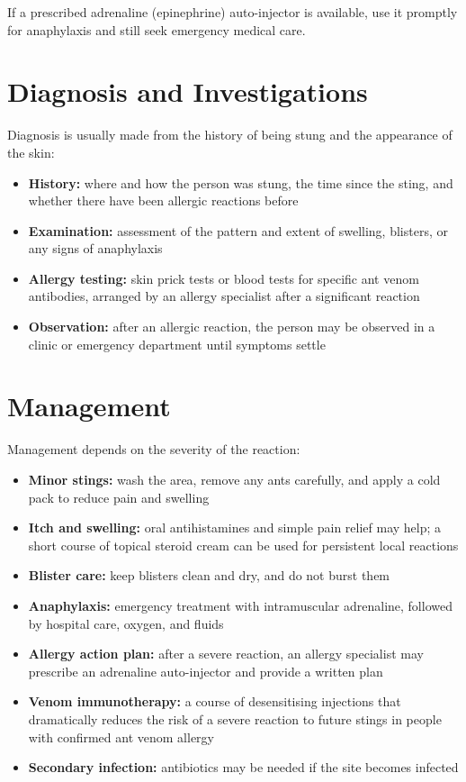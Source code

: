 If a prescribed adrenaline (epinephrine) auto-injector is available, use it promptly for anaphylaxis and still seek emergency medical care.

\section*{Diagnosis and Investigations}
Diagnosis is usually made from the history of being stung and the appearance of the skin:

\begin{itemize}
    \item \textbf{History:} where and how the person was stung, the time since the sting, and whether there have been allergic reactions before
    \item \textbf{Examination:} assessment of the pattern and extent of swelling, blisters, or any signs of anaphylaxis
    \item \textbf{Allergy testing:} skin prick tests or blood tests for specific ant venom antibodies, arranged by an allergy specialist after a significant reaction
    \item \textbf{Observation:} after an allergic reaction, the person may be observed in a clinic or emergency department until symptoms settle
\end{itemize}

\section*{Management}
Management depends on the severity of the reaction:

\begin{itemize}
    \item \textbf{Minor stings:} wash the area, remove any ants carefully, and apply a cold pack to reduce pain and swelling
    \item \textbf{Itch and swelling:} oral antihistamines and simple pain relief may help; a short course of topical steroid cream can be used for persistent local reactions
    \item \textbf{Blister care:} keep blisters clean and dry, and do not burst them
    \item \textbf{Anaphylaxis:} emergency treatment with intramuscular adrenaline, followed by hospital care, oxygen, and fluids
    \item \textbf{Allergy action plan:} after a severe reaction, an allergy specialist may prescribe an adrenaline auto-injector and provide a written plan
    \item \textbf{Venom immunotherapy:} a course of desensitising injections that dramatically reduces the risk of a severe reaction to future stings in people with confirmed ant venom allergy
    \item \textbf{Secondary infection:} antibiotics may be needed if the site becomes infected
\end{itemize}

